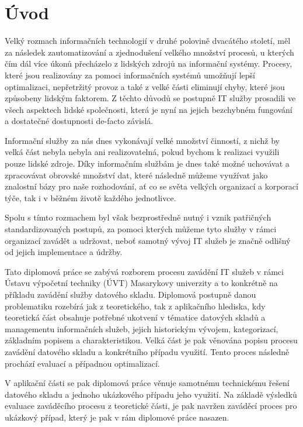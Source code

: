 \documentclass[
  digital,     %
  twoside,     %
  lof,         %
  lot,         %
]{fithesis4}
\begin{document}
\chapter{Úvod}
Velký rozmach informačních technologií v druhé polovině dvacátého století, měl za následek zautomatizování a zjednodušení velkého množství procesů, u kterých čím dál více úkonů přecházelo z lidských zdrojů na informační systémy. Procesy, které jsou realizovány za pomoci informačních systémů umožňují lepší optimalizaci, nepřetržitý provoz a také z velké části eliminují chyby, které jsou způsobeny lidským faktorem. Z těchto důvodů se postupně IT služby prosadili ve všech aspektech lidské společnosti, která je nyní na jejich bezchybném fungování a dostatečné dostupnosti de-facto závislá. 

Informační služby za nás dnes vykonávají velké množství činností, z nichž by velká část nebyla nebyla ani realizovatelná, pokud bychom k realizaci využili pouze lidské zdroje. Díky informačním službám je dnes také možné uchovávat a zpracovávat obrovské množství dat, které následně můžeme využívat jako znalostní bázy pro naše rozhodování, ať co se světa velkých organizací a korporací týče, tak i v běžném životě každého jednotlivce. 

Spolu s tímto rozmachem byl však bezprostředně nutný i vznik patřičných standardizovaných postupů, za pomoci kterých můžeme tyto služby v rámci organizací zavádět a udržovat, neboť samotný vývoj IT služeb je značně odlišný od jejich implementace a údržby. 

Tato diplomová práce se zabývá rozborem procesu zavádění IT služeb v rámci Ústavu výpočetní techniky (ÚVT) Masarykovy univerzity a to konkrétně na příkladu zavádění služby datového skladu. Diplomová postupně danou problematiku rozebírá jak z teoretického, tak z aplikačního hlediska, kdy teoretická část obsahuje potřebné ukotvení v tématice datových skladů a managementu informačních služeb, jejich historickým vývojem, kategorizací, základním popisem a charakteristikou. Velká část je pak věnována popisu procesu zavádění datového skladu a konkrétního případu využití. Tento proces následně prochází evaluací a případnou optimalizací. 

V aplikační části se pak diplomová práce věnuje samotnému technickému řešení datového skladu a jednoho ukázkového případu jeho využití. Na základě výsledků evaluace zaváděcího procesu z teoretické části, je pak navržen zaváděcí proces pro ukázkový případ, který je pak v rám diplomové práce nasazen. 
\end{document}
